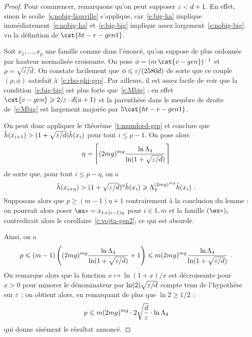 \begin{proof}
  Pour commencer, remarquons qu'on peut supposer \( \varepsilon < d + 1 \). En effet,
  sinon le scolie~\vref{s:nobig-liouville} s'applique, car~\eqref{e:big-ha}
  implique immédiatement~\eqref{e:nobig-ha} et~\eqref{e:big-big} implique
  assez largement~\eqref{e:nobig-big} vu la définition de \( \cst{ht-v-gen1}
  \).

  Soit \( x_1, \dots, x_p \) une famille comme dans l'énoncé, qu'on suppose de
  plus ordonnée par hauteur normalisée croissante. On pose
  \( \phi =( m \, \cst{v-gen})^{-1} \) et
  \( \rho = \sqrt{ \varepsilon / d } \).  On constate facilement que
  \( \phi \leqslant \varepsilon / (2580 d) \) de sorte que ce couple \( (\rho, \phi) \)
  satisfait à~\eqref{e:rho-phi-grp}. Par ailleurs, il est assez facile de voir
  que la condition~\eqref{e:big-big} est plus forte que~\eqref{e:Mbig} : en
  effet \( \cst{v-gen} \ge 2/\eps \cdot \adeg (\adim+1) \) et la parenthèse
  dans le membre de droite de~\eqref{e:Mbig} est largement majorée par \( 5
    \cst{ht-v-gen1} \).

  On peut donc appliquer le théorème~\vref{t:mumford-grp} et conclure que
  \( \hat h ( x_{i+1} ) > (1 + \sqrt{\varepsilon / d}) \hat h ( x_i ) \) pour tout
  \( i \le p-1 \). On pose alors
  \begin{equation}
    \eta
    =
    \left\lceil
      (2mg)^{mg}
      \frac{ \ln \Lambda_4 }{ \ln (1 + \sqrt{\varepsilon / d}) }
    \right\rceil
  \end{equation}
  de sorte que, pour tout \( i \le p - \eta \), on a
  \begin{equation}
    \hat h ( x_{i+\eta} )
    >
    (1 + \sqrt{\varepsilon / d})^\eta
    \hat h ( x_i )
    \geqslant
    \Lambda_4^{(2mg)^{mg}}
    \hat h ( x_i )
    \text{ .}
  \end{equation}
  Supposons alors que \( p \ge (m - 1) \eta + 1 \) contrairement à la
  conclusion du lemme : on pourrait alors poser \( \ex* = x_{1 + (\fct-1)
      \eta} \) pour \( i \in {1, m} \) et la famille \( (\ex*)_\fct \)
  contredirait alors le corollaire~\vref{c:vojta-gen2}, ce qui est absurde.

  Ainsi, on a
  \begin{equation}
    p
    \leqslant
    (m - 1)
    \left(
      (2mg)^{mg}
      \frac{ \ln \Lambda_4 }{ \ln (1 + \sqrt{\varepsilon / d}) }
      + 1
    \right)
    \leqslant
    m
    (2mg)^{mg}
    \frac{ \ln \Lambda_4 }{ \ln (1 + \sqrt{\varepsilon / d}) }
    \text{ .}
  \end{equation}
  On remarque alors que la fonction \( x \mapsto \ln(1+x)/x \) est
  décroissante pour \( x > 0 \) pour minorer le dénominateur par \( \ln(2)
    \sqrt{\varepsilon / d} \) compte tenu de l'hypothèse sur \( \varepsilon \) ; on
  obtient alors, en remarquant de plus que \( \ln 2 \ge 1/2 \) :
  \begin{equation}
    p
    \leqslant
    m (2mg)^{mg}
    \cdot 2 \sqrt{\frac d {\varepsilon}}
    \cdot \ln \Lambda_4
  \end{equation}
  qui donne aisément le résultat annoncé.
\end{proof}


